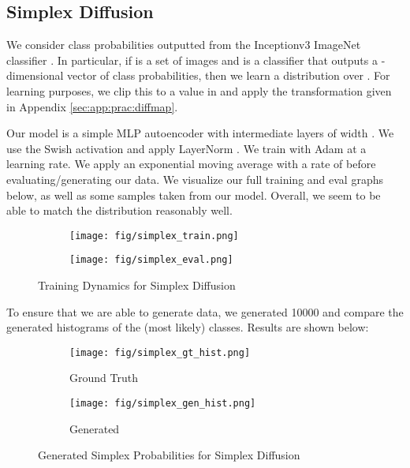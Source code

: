 \documentclass{article}
\theoremstyle{plain}
\theoremstyle{definition}
\theoremstyle{remark}
\begin{document}
\subsection{Simplex Diffusion}\label{sec:app:experiment:simplex}

We consider class probabilities outputted from the Inceptionv3 ImageNet classifier \citep{Szegedy2015RethinkingTI}. In particular, if  is a set of images and  is a classifier that outputs a -dimensional vector of class probabilities, then we learn a distribution over . For learning purposes, we clip this to a value in  and apply the transformation given in Appendix \ref{sec:app:prac:diffmap}.

Our model is a simple MLP autoencoder with  intermediate layers of width . We use the Swish activation \citep{Ramachandran2017SwishAS} and apply LayerNorm \citep{Ba2016LayerN}. We train with Adam \citep{Kingma2014AdamAM} at a  learning rate. We apply an exponential moving average with a rate of  before evaluating/generating our data. We visualize our full training and eval graphs below, as well as some samples taken from our model. Overall, we seem to be able to match the distribution reasonably well.
\begin{figure}[H]
    \centering
    \begin{subfigure}[b]{0.48\textwidth}
        \texttt{[image: fig/simplex\_train.png]}
    \end{subfigure}
    \hfill
    \begin{subfigure}[b]{0.48\textwidth}
        \texttt{[image: fig/simplex\_eval.png]}
    \end{subfigure}
    \caption{Training Dynamics for Simplex Diffusion}
\end{figure}
To ensure that we are able to generate data, we generated 10000 and compare the generated histograms of the (most likely) classes. Results are shown below:
\begin{figure}[H]
    \centering
    \begin{subfigure}[b]{0.48\textwidth}
        \texttt{[image: fig/simplex\_gt\_hist.png]}
        \caption{Ground Truth}
    \end{subfigure}
    \hfill
    \begin{subfigure}[b]{0.48\textwidth}
        \texttt{[image: fig/simplex\_gen\_hist.png]}
        \caption{Generated}
    \end{subfigure}
    \caption{Generated Simplex Probabilities for Simplex Diffusion}
\end{figure}
\end{document}
